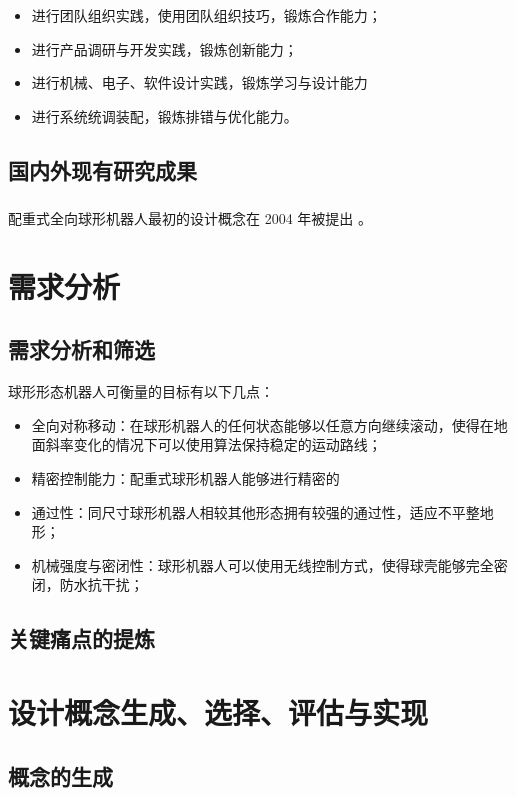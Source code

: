 \documentclass[a4paper]{ctexart}
\newcommand{ \upcite}[1]{\textsuperscript{\textsuperscript{\cite{#1} } }}
\numberwithin{equation}{section}
\numberwithin{table}{section}
\numberwithin{figure}{section}
\begin{document}
\begin{itemize}
  \item 进行团队组织实践，使用团队组织技巧，锻炼合作能力；
  \item 进行产品调研与开发实践，锻炼创新能力；
  \item 进行机械、电子、软件设计实践，锻炼学习与设计能力
  \item 进行系统统调装配，锻炼排错与优化能力。
\end{itemize}

\subsection{国内外现有研究成果}

配重式全向球形机器人最初的设计概念在 2004 年被提出\upcite{2004Introducing}。

\section{需求分析}

\subsection{需求分析和筛选}

球形形态机器人可衡量的目标有以下几点：

\begin{itemize}
  \item 全向对称移动：在球形机器人的任何状态能够以任意方向继续滚动，使得在地面斜率变化的情况下可以使用算法保持稳定的运动路线；
  \item 精密控制能力：配重式球形机器人能够进行精密的
  \item 通过性：同尺寸球形机器人相较其他形态拥有较强的通过性，适应不平整地形；
  \item 机械强度与密闭性：球形机器人可以使用无线控制方式，使得球壳能够完全密闭，防水抗干扰；
\end{itemize}

\subsection{关键痛点的提炼}

\section{设计概念生成、选择、评估与实现}


\subsection{概念的生成}
\end{document}

